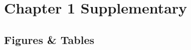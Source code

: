 


\section{Chapter 1 Supplementary}
\label{apdx:supplemental}


\subsection{Figures \& Tables}
\label{subapdx:figtabs}
\newpage






